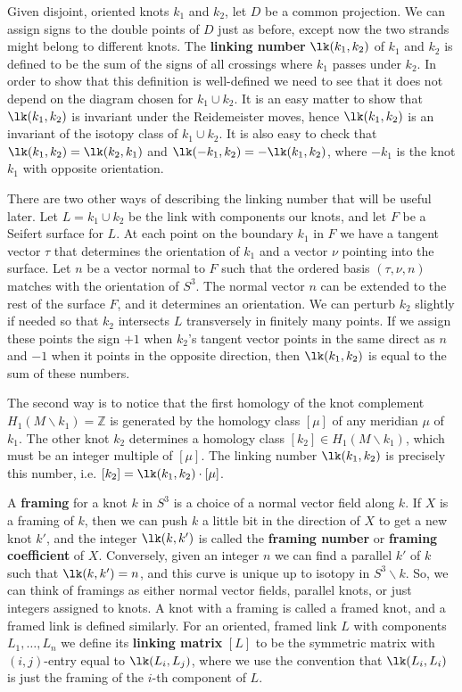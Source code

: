 Given disjoint, oriented knots $k_1$ and $k_2$, let $D$ be a common projection. We can assign signs to the double points of $D$ just as before, except now the two strands might belong to different knots. The \textbf{linking number} $\lk(k_1,k_2)$ of $k_1$ and $k_2$ is defined to be the sum of the signs of all crossings where $k_1$ passes under $k_2$. In order to show that this definition is well-defined we need to see that it does not depend on the diagram chosen for $k_1 \cup k_2$. It is an easy matter to show that $\lk(k_1,k_2)$ is invariant under the Reidemeister moves, hence $\lk(k_1,k_2)$ is an invariant of the isotopy class of $k_1 \cup k_2$. It is also easy to check that $\lk(k_1,k_2)=\lk(k_2,k_1)$ and $\lk(-k_1,k_2) = -\lk(k_1,k_2)$, where $-k_1$ is the knot $k_1$ with opposite orientation. 

There are two other ways of describing the linking number that will be useful later. Let $L = k_1 \cup k_2$ be the link with components our knots, and let $F$ be a Seifert surface for $L$. At each point on the boundary $k_1$ in $F$ we have a tangent vector $\tau$ that determines the orientation of $k_1$ and a vector $\nu$ pointing into the surface. Let $n$ be a vector normal to $F$ such that the ordered basis $(\tau,\nu,n)$ matches with the orientation of $S^3$. The normal vector $n$ can be extended to the rest of the surface $F$, and it determines an orientation. We can perturb $k_2$ slightly if needed so that $k_2$ intersects $L$ transversely in finitely many points. If we assign these points the sign $+1$ when $k_2$'s tangent vector points in the same direct as $n$ and $-1$ when it points in the opposite direction, then $\lk(k_1,k_2)$ is equal to the sum of these numbers. 

The second way is to notice that the first homology of the knot complement $H_1(M\backslash k_1) = \mathbb Z$ is generated by the homology class $[\mu]$ of any meridian $\mu$ of $k_1$. The other knot $k_2$ determines a homology class $[k_2] \in H_1(M\backslash k_1)$, which must be an integer multiple of $[\mu]$. The linking number $\lk(k_1,k_2)$ is precisely this number, i.e. $[k_2] = \lk(k_1,k_2) \cdot [\mu]$. 

A \textbf{framing} for a knot $k$ in $S^3$ is a choice of a normal vector field along $k$. If $X$ is a framing of $k$, then we can push $k$ a little bit in the direction of $X$ to get a new knot $k'$, and the integer $\lk(k,k')$ is called the \textbf{framing number} or \textbf{framing coefficient} of $X$. Conversely, given an integer $n$ we can find a parallel $k'$ of $k$ such that $\lk(k,k')=n$, and this curve is unique up to isotopy in $S^3 \backslash k$. So, we can think of framings as either normal vector fields, parallel knots, or just integers assigned to knots. A knot with a framing is called a framed knot, and a framed link is defined similarly. For an oriented, framed link $L$ with components $L_1,\ldots,L_n$ we define its \textbf{linking matrix} $[L]$ to be the symmetric matrix with $(i,j)$-entry equal to $\lk(L_i,L_j)$, where we use the convention that $\lk(L_i,L_i)$ is just the framing of the $i$-th component of $L$.

